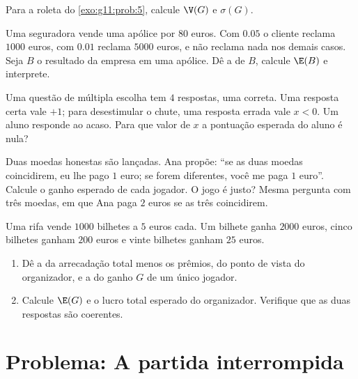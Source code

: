 \begin{exercise}[$\star\star$]\label{exo:g11:prob:7}
Para a roleta do \cref{exo:g11:prob:5}, calcule $\V(G)$ e $\sigma(G)$.
\end{exercise}

\begin{exercise}[$\star\star$]\label{exo:g11:prob:8}
Uma seguradora vende uma apólice por $80$ euros. Com 
$0.05$ o cliente reclama $1000$ euros, com  $0.01$ reclama
$5000$ euros, e não reclama nada nos demais casos. Seja $B$ o resultado
da empresa em uma apólice. Dê a  de $B$, calcule $\E(B)$ e
interprete.
\end{exercise}

\begin{exercise}[$\star\star$]\label{exo:g11:prob:9}
Uma questão de múltipla escolha tem $4$ respostas, uma correta. Uma
resposta certa vale $+1$; para desestimular o chute, uma resposta errada
vale $x < 0$. Um aluno responde ao acaso. Para que valor de $x$ a
pontuação esperada do aluno é nula?
\end{exercise}

\begin{exercise}[$\star\star$]\label{exo:g11:prob:10}
Duas moedas honestas são lançadas. Ana propõe: ``se as duas moedas
coincidirem, eu lhe pago $1$ euro; se forem diferentes, você me paga $1$
euro''. Calcule o ganho esperado de cada jogador. O jogo é justo? Mesma
pergunta com três moedas, em que Ana paga $2$ euros se as três
coincidirem.
\end{exercise}

\begin{exercise}[$\star\star\star$]\label{exo:g11:prob:11}
Uma rifa vende $1000$ bilhetes a $5$ euros cada. Um bilhete ganha
$2000$ euros, cinco bilhetes ganham $200$ euros e vinte bilhetes ganham
$25$ euros.
\begin{enumerate}
  \item Dê a  da arrecadação total menos os prêmios, do ponto
        de vista do organizador, e a do ganho $G$ de um único jogador.
  \item Calcule $\E(G)$ e o lucro total esperado do organizador.
        Verifique que as duas respostas são coerentes.
\end{enumerate}
\end{exercise}

\section{Problema: A partida interrompida}

